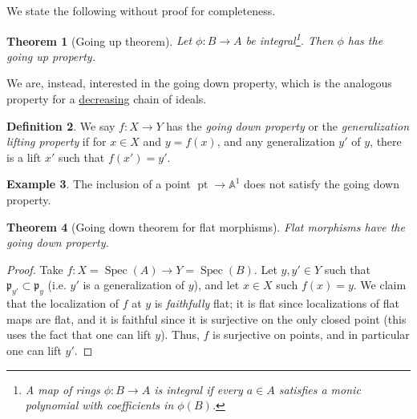 \documentclass[10pt]{article}
\newtheorem{thm}{Theorem}[section]
\theoremstyle{definition}
\newtheorem{exmp}[thm]{Example}
\newtheorem{defn}[thm]{Definition}
\DeclareMathOperator{\Spec}{Spec}
\DeclareMathOperator{\pt}{pt}
\newcommand{\AAA}{\mathbb{A}}
\newcommand{\mf}{\mathfrak}
\begin{document}

We state the following without proof for completeness.
\begin{thm}[Going up theorem]
Let $\phi: B \rightarrow A$ be integral\footnote{A map of rings $\phi: B \rightarrow A$ is \emph{integral} if every $a \in A$ satisfies a monic polynomial with coefficients in $\phi(B)$.}.  Then $\phi$ has the going up property.
\end{thm}

We are, instead, interested in the going down property, which is the analogous property for a \underline{decreasing} chain of ideals.
\begin{defn}
We say $f: X \rightarrow Y$ has the \emph{going down property} or the \emph{generalization lifting property} if for $x \in X$ and $y = f(x)$, and any generalization $y'$ of $y$, there is a lift $x'$ such that $f(x') = y'$.
\end{defn}

\begin{exmp}
The inclusion of a point $\pt \rightarrow \AAA^1$ does not satisfy the going down property.
\end{exmp}

\begin{thm}[Going down theorem for flat morphisms]
Flat morphisms have the going down property.
\end{thm}
\begin{proof}
Take $f: X = \Spec(A) \rightarrow Y = \Spec(B)$.  Let $y, y' \in Y$ such that $\mf{p}_{y'} \subset \mf{p}_{y}$ (i.e. $y'$ is a generalization of $y$), and let $x \in X$ such $f(x) = y$.  We claim that the localization of $f$ at $y$ is \emph{faithfully} flat; it is flat since localizations of flat maps are flat, and it is faithful since it is surjective on the only closed point (this uses the fact that one can lift $y$).  Thus, $f$ is surjective on points, and in particular one can lift $y'$.
\end{proof}
\end{document}
